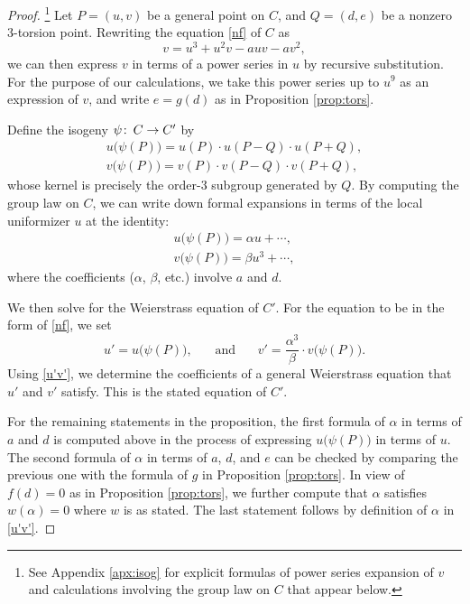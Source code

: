 \documentclass{gtpart}
\theoremstyle{definition}
\theoremstyle{remark}
\def\co{\colon\thinspace}
\newcommand{\A}{\alpha}
\begin{document}
\begin{proof}
 \footnote{See Appendix \ref{apx:isog} for explicit formulas of power series expansion of $v$ and calculations involving the group law on $C$ that appear below.  }
 Let $P = (u,v)$ be a general point on $C$, and $Q = (d,e)$ be a nonzero 3-torsion point.  
 Rewriting the equation \eqref{nf} of $C$ as 
 \[
  v = u^3 + u^2 v - a u v - a v^2, 
 \]
 we can then express $v$ in terms of a power series in $u$ by recursive substitution.  
 For the purpose of our calculations, we take this power series up to $u^9$ as an expression of $v$, 
 and write $e = g(d)$ as in Proposition \ref{prop:tors}.  

 Define the isogeny $\psi \co C \to C'$ by 
 \begin{equation}
 \label{defpsi}
  \begin{array}{l}
   u\big(\psi(P)\big) = u(P) \cdot u(P-Q) \cdot u(P+Q), \\
   v\big(\psi(P)\big) = v(P) \cdot v(P-Q) \cdot v(P+Q), 
  \end{array}
 \end{equation}
 whose kernel is precisely the order-3 subgroup generated by $Q$.  
 By computing the group law on $C$, we can write down formal expansions in terms of the local uniformizer $u$ at the identity: 
 \begin{equation}
 \label{u'v'}
  \begin{array}{l}
   u\big(\psi(P)\big) = \A u + \cdots, \\
   v\big(\psi(P)\big) = \beta u^3 + \cdots, 
  \end{array}
 \end{equation}
 where the coefficients ($\A$, $\beta$, etc.) involve $a$ and $d$.  

 We then solve for the Weierstrass equation of $C'$.  
 For the equation to be in the form of \eqref{nf}, we set 
 \[
  u' = u\big(\psi(P)\big),~~~~~~~~\text{and}~~~~~~~~v' = \frac{\A^3}{\beta} \cdot v\big(\psi(P)\big).  
 \]
 Using \eqref{u'v'}, we determine the coefficients of a general Weierstrass equation that $u'$ and $v'$ satisfy. This is the stated equation of $C'$.  
  
 For the remaining statements in the proposition, 
 the first formula of $\A$ in terms of $a$ and $d$ is computed above in the process of expressing $u\big(\psi(P)\big)$ in terms of $u$.  
 The second formula of $\A$ in terms of $a$, $d$, and $e$ can be checked by comparing the previous one with the formula of $g$ in Proposition \ref{prop:tors}.  
 In view of $f(d) = 0$ as in Proposition \ref{prop:tors}, we further compute that $\A$ satisfies $w(\A) = 0$ where $w$ is as stated.  
 The last statement follows by definition of $\A$ in \eqref{u'v'}.  
\end{proof}
\end{document}

